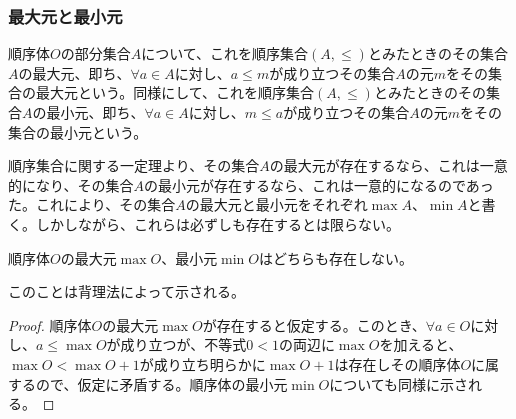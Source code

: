 \documentclass[dvipdfmx]{jsarticle}
\begin{document}
\subsubsection{最大元と最小元}%
\begin{dfn}
順序体$O$の部分集合$A$について、これを順序集合$(A, \leq )$とみたときのその集合$A$の最大元、即ち、$\forall a \in A$に対し、$a \leq m$が成り立つその集合$A$の元$m$をその集合の最大元という。同様にして、これを順序集合$(A, \leq )$とみたときのその集合$A$の最小元、即ち、$\forall a \in A$に対し、$m \leq a$が成り立つその集合$A$の元$m$をその集合の最小元という。\par
順序集合に関する一定理より、その集合$A$の最大元が存在するなら、これは一意的になり、その集合$A$の最小元が存在するなら、これは一意的になるのであった。これにより、その集合$A$の最大元と最小元をそれぞれ$\max A$、$\min A$と書く。しかしながら、これらは必ずしも存在するとは限らない。
\end{dfn}
\begin{thm}\label{4.1.1.9}
順序体$O$の最大元$\max O$、最小元$\min O$はどちらも存在しない。
\end{thm}\par
このことは背理法によって示される。
\begin{proof}
順序体$O$の最大元$\max O$が存在すると仮定する。このとき、$\forall a \in O$に対し、$a \leq \max O$が成り立つが、不等式$0 < 1$の両辺に$\max O$を加えると、$\max O < \max O + 1$が成り立ち明らかに$\max O + 1$は存在しその順序体$O$に属するので、仮定に矛盾する。順序体の最小元$\min O$についても同様に示される。
\end{proof}
\end{document}
